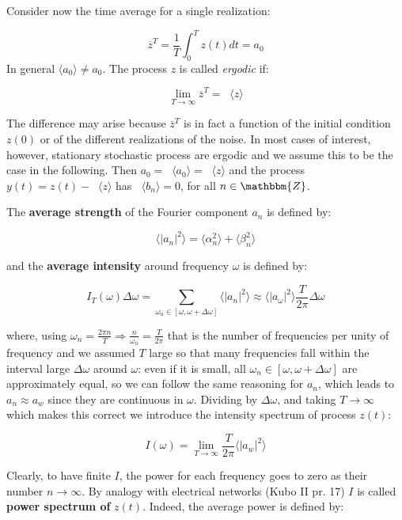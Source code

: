 \documentclass{article}
\newcommand*\mean[1]{\mathop{}\!\langle#1 \rangle }
\begin{document}
Consider now the time average for a single realization:

$$\overline{z}^T = \frac{1}{T} \int_{0}^{T} z(t) dt = a_0$$
\newpage
In general $ \langle a_0 \rangle \ne a_0$. The process $z$ is called \textit{ergodic} if:

\begin{equation}
\lim\limits_{T \to \infty} \overline{z}^T  = \mean{z}
\end{equation}

The difference may arise because $ \overline{z}^T$ is in fact a function of the initial condition $z(0)$ or of the different realizations of the noise. In most cases of interest, however, stationary stochastic process are ergodic and we assume this to be the case in the following. Then $a_0 = \mean{a_0} = \mean{z}$ and the process $y(t) = z(t) - \mean{z}$ has $\mean{b_n}=0$, for all $n \in \mathbbm{Z}$.

The \textbf{average strength} of the Fourier component $a_n$ is defined by:

$$\langle |a_n|^2 \rangle = \langle \alpha_n^2 \rangle + \langle \beta_n^2 \rangle $$

and the \textbf{average intensity} around frequency $\omega$ is defined by:

\begin{equation}
I_T(\omega) \Delta \omega = \sum_{\omega_n \in [\omega, \omega +\Delta \omega]} \langle |a_n|^2 \rangle \approx  \langle |a_{\omega}|^2 \rangle \frac{T}{2 \pi}  \Delta \omega
\end{equation}

where, using $\omega_n = \frac{2 \pi n}{T} \Rightarrow \frac{n}{\omega_n} = \frac{T}{2 \pi}$ that is the number of frequencies per unity of frequency and we assumed $T$ large so that many frequencies fall within the interval large $\Delta \omega$ around $\omega$: even if it is small, all $\omega_n \in [\omega, \omega +\Delta \omega]$ are approximately equal, so we can follow the same reasoning for $a_n$, which leads to $a_n \approx a_w$ since they are continuous in $\omega$. Dividing by $\Delta \omega$, and taking $T \to \infty$ which makes this correct we introduce the intensity spectrum of process $z(t)$:

\begin{equation}
I(\omega) = \lim\limits_{T \to \infty} \frac{T}{2 \pi} \langle |a_w|^2 \rangle
\end{equation}

Clearly, to have finite $I$, the power for each frequency goes to zero as their number $n \to \infty$. By analogy with electrical networks (Kubo II pr. 17) $I$ is called \textbf{power spectrum of} $z(t)$. Indeed, the average power is defined by:
\end{document}
